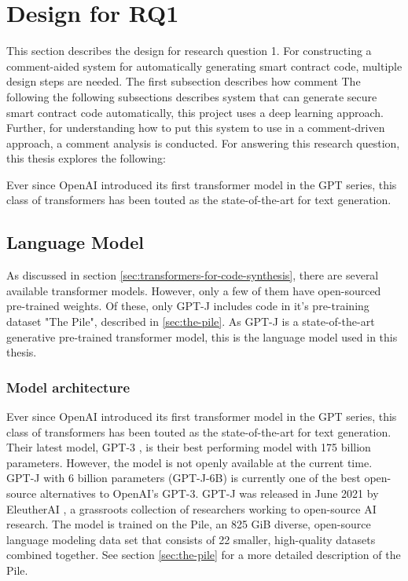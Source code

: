 \section{Design for RQ1}
\label{sec:design-for-rq1}
This section describes the design for research question 1. For constructing a comment-aided system for automatically generating smart contract code, multiple design steps are needed. The first subsection describes how comment The following the following subsections describes system that can generate secure smart contract code automatically, this project uses a deep learning approach. Further, for understanding how to put this system to use in a comment-driven approach, a comment analysis is conducted. 
For answering this research question, this thesis explores the following:


Ever since OpenAI introduced its first transformer model in the GPT series, this class of transformers has been touted as the state-of-the-art for text generation.

\subsection{Language Model}
\label{sec:language-model}
As discussed in section \cref{sec:transformers-for-code-synthesis}, there are several available transformer models. However, only a few of them have open-sourced pre-trained weights. Of these, only GPT-J \cite{gpt-j} includes code in it's pre-training dataset "The Pile", described in \cref{sec:the-pile}. As GPT-J is a state-of-the-art generative pre-trained transformer model, this is the language model used in this thesis. 

\subsubsection{Model architecture}
\label{sec:architecture}
Ever since OpenAI introduced its first transformer model in the GPT series, this class of transformers has been touted as the state-of-the-art for text generation. Their latest model, GPT-3 \cite{brown2020language}, is their best performing model with 175 billion parameters. However, the model is not openly available at the current time. GPT-J \cite{gpt-j} with 6 billion parameters (GPT-J-6B) is currently one of the best open-source alternatives to OpenAI's GPT-3. GPT-J was released in June 2021 by EleutherAI \cite{elutherai}, a grassroots collection of researchers working to open-source AI research. The model is trained on the Pile, an 825 GiB diverse, open-source language modeling data set that consists of 22 smaller, high-quality datasets combined together. See section \cref{sec:the-pile} for a more detailed description of the Pile.

